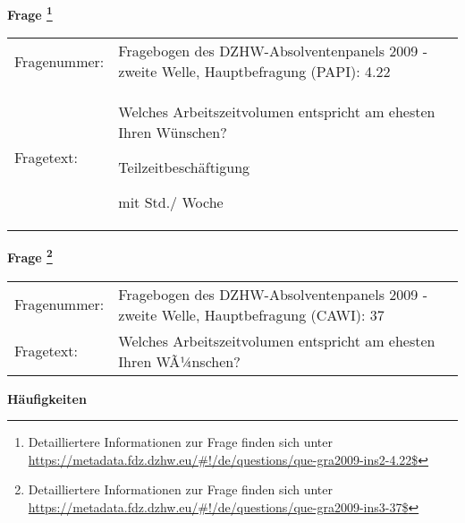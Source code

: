				\vspace*{0.5cm}
                \noindent\textbf{Frage
	                \footnote{Detailliertere Informationen zur Frage finden sich unter
		              \url{https://metadata.fdz.dzhw.eu/\#!/de/questions/que-gra2009-ins2-4.22$}}}\\
				\begin{tabularx}{\hsize}{@{}lX}
					Fragenummer: &
					  Fragebogen des DZHW-Absolventenpanels 2009 - zweite Welle, Hauptbefragung (PAPI):
					  4.22
 \\
					Fragetext: & Welches Arbeitszeitvolumen entspricht am ehesten Ihren Wünschen?\par  Teilzeitbeschäftigung\par  mit Std./ Woche \\
				\end{tabularx}
				\vspace*{0.5cm}
                \noindent\textbf{Frage
	                \footnote{Detailliertere Informationen zur Frage finden sich unter
		              \url{https://metadata.fdz.dzhw.eu/\#!/de/questions/que-gra2009-ins3-37$}}}\\
				\begin{tabularx}{\hsize}{@{}lX}
					Fragenummer: &
					  Fragebogen des DZHW-Absolventenpanels 2009 - zweite Welle, Hauptbefragung (CAWI):
					  37
 \\
					Fragetext: & Welches Arbeitszeitvolumen entspricht am ehesten Ihren WÃ¼nschen? \\
				\end{tabularx}





        		\vspace*{0.5cm}
                \noindent\textbf{Häufigkeiten}

